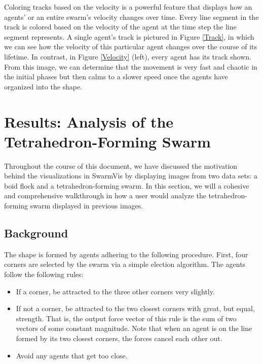 \documentclass[conference]{IEEEtran}
\begin{document}
Coloring tracks based on the velocity is a powerful feature that displays how an agents' or an entire swarm's
velocity changes over time.
Every line segment in the track is colored based on the velocity of the agent at the time step the line segment represents.
A single agent's track is pictured in Figure \ref{Track}, in which we can see how the velocity of this particular agent changes
over the course of its lifetime.
In contrast, in Figure \ref{Velocity} (left), every agent has its track shown.
From this image, we can determine that the movement is very fast and chaotic in the initial phases but then calms to a slower
speed once the agents have organized into the shape.

\section{Results: Analysis of the Tetrahedron-Forming Swarm}

Throughout the course of this document, we have discussed the motivation behind the visualizations in SwarmVis by
displaying images from two data sets: a boid flock and a tetrahedron-forming swarm.
In this section, we will a cohesive and comprehensive walkthrough in how a user would
analyze the tetrahedron-forming swarm displayed in previous images.

\subsection{Background}

The shape is formed by agents adhering to the following procedure.
First, four corners are selected by the swarm via a simple election algorithm.
The agents follow the following rules:
\begin{itemize}
	\item If a corner, be attracted to the three other corners very slightly.
	\item If not a corner, be attracted to the two closest corners with great, but equal, strength.
	That is, the output force vector of this rule is the sum of two vectors of some constant magnitude.
	Note that when an agent is on the line formed by its two closest corners, the forces cancel each other out.
	\item Avoid any agents that get too close.
\end{itemize}
\end{document}
